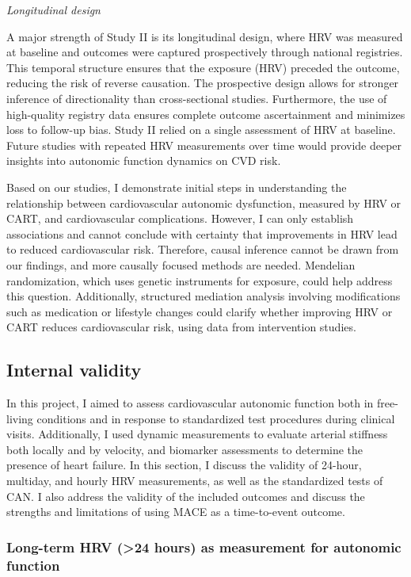 \documentclass[
  a4paper,
  headsepline=true,
  open=any]{scrbook}
\begin{document}
\emph{Longitudinal design}

A major strength of Study II is its longitudinal design, where HRV was
measured at baseline and outcomes were captured prospectively through
national registries. This temporal structure ensures that the exposure
(HRV) preceded the outcome, reducing the risk of reverse causation. The
prospective design allows for stronger inference of directionality than
cross-sectional studies. Furthermore, the use of high-quality registry
data ensures complete outcome ascertainment and minimizes loss to
follow-up bias. Study II relied on a single assessment of HRV at
baseline. Future studies with repeated HRV measurements over time would
provide deeper insights into autonomic function dynamics on CVD risk.

Based on our studies, I demonstrate initial steps in understanding the
relationship between cardiovascular autonomic dysfunction, measured by
HRV or CART, and cardiovascular complications. However, I can only
establish associations and cannot conclude with certainty that
improvements in HRV lead to reduced cardiovascular risk. Therefore,
causal inference cannot be drawn from our findings, and more causally
focused methods are needed. Mendelian randomization, which uses genetic
instruments for exposure, could help address this question.
Additionally, structured mediation analysis involving modifications such
as medication or lifestyle changes could clarify whether improving HRV
or CART reduces cardiovascular risk, using data from intervention
studies.

\hypertarget{internal-validity}{%
\subsection{Internal validity}\label{internal-validity}}

In this project, I aimed to assess cardiovascular autonomic function
both in free-living conditions and in response to standardized test
procedures during clinical visits. Additionally, I used dynamic
measurements to evaluate arterial stiffness both locally and by
velocity, and biomarker assessments to determine the presence of heart
failure. In this section, I discuss the validity of 24-hour, multiday,
and hourly HRV measurements, as well as the standardized tests of CAN. I
also address the validity of the included outcomes and discuss the
strengths and limitations of using MACE as a time-to-event outcome.

\hypertarget{long-term-hrv-24-hours-as-measurement-for-autonomic-function}{%
\subsubsection{Long-term HRV (\textgreater24 hours) as measurement for
autonomic
function}\label{long-term-hrv-24-hours-as-measurement-for-autonomic-function}}
\end{document}
